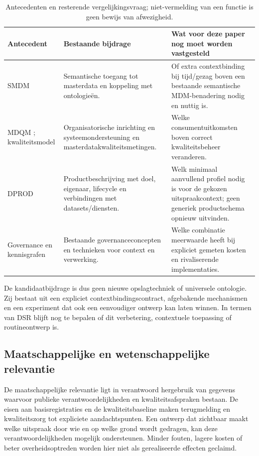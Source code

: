\begin{longtable}{@{}P{.22\linewidth}P{.32\linewidth}P{.38\linewidth}@{}}
\caption{Antecedenten en resterende vergelijkingsvraag; niet-vermelding van een functie is geen bewijs van afwezigheid.}\\
\toprule Antecedent & Bestaande bijdrage & Wat voor deze paper nog moet worden vastgesteld \\ \midrule
SMDM \citep{L18} & Semantische toegang tot masterdata en koppeling met ontologieën. & Of extra contextbinding bij tijd/gezag boven een bestaande semantische MDM-benadering nodig en nuttig is. \\
MDQM \citep{L05}; kwaliteitsmodel \citep{L19} & Organisatorische inrichting en systeemondersteuning en masterdatakwaliteitsmetingen. & Welke consumentuitkomsten boven correct kwaliteitsbeheer veranderen. \\
DPROD \citep{S51} & Productbeschrijving met doel, eigenaar, lifecycle en verbindingen met datasets/diensten. & Welk minimaal aanvullend profiel nodig is voor de gekozen uitspraakcontext; geen generiek productschema opnieuw uitvinden. \\
Governance en kennisgrafen \citep{L07,L13} & Bestaande governanceconcepten en technieken voor context en verwerking. & Welke combinatie meerwaarde heeft bij expliciet gemeten kosten en rivaliserende implementaties. \\
\bottomrule\end{longtable}

De kandidaatbijdrage is dus geen nieuwe opslagtechniek of universele ontologie. Zij bestaat uit een expliciet contextbindingscontract, afgebakende mechanismen en een experiment dat ook een eenvoudiger ontwerp kan laten winnen. In termen van DSR blijft nog te bepalen of dit verbetering, contextuele toepassing of routineontwerp is. \citep{L04}

\subsection{Maatschappelijke en wetenschappelijke relevantie}
De maatschappelijke relevantie ligt in verantwoord hergebruik van gegevens waarvoor publieke verantwoordelijkheden en kwaliteitsafspraken bestaan. De eisen aan basisregistraties en de kwaliteitsbaseline maken terugmelding en kwaliteitszorg tot expliciete aandachtspunten. \citep{S25,S26} Een ontwerp dat zichtbaar maakt welke uitspraak door wie en op welke grond wordt gedragen, kan deze verantwoordelijkheden mogelijk ondersteunen. Minder fouten, lagere kosten of beter overheidsoptreden worden hier niet als gerealiseerde effecten geclaimd.

